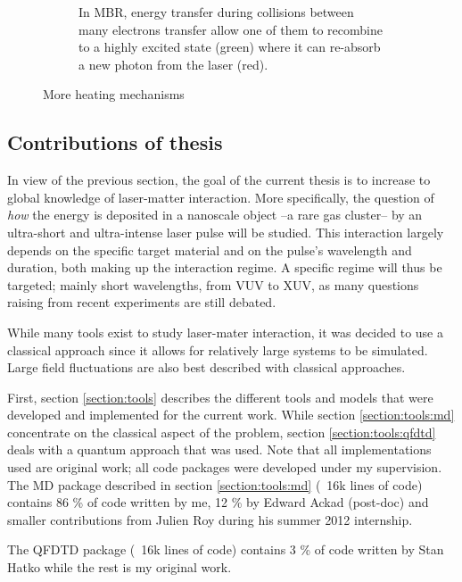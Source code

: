 \begin{figure}
\begin{subfigure}{0.48\columnwidth}
        \caption{In MBR, energy transfer during collisions between many
                 electrons transfer allow one of them to recombine to a highly
                 excited state (green) where it can re-absorb a new photon from
                 the laser (red).}
        \label{fig:heating:mbr}
    \end{subfigure}
 \caption{More heating mechanisms}
 \label{fig:heating}
\end{figure}






\subsection{Contributions of thesis}

In view of the previous section, the goal of the current thesis is to increase
to global knowledge of laser-matter interaction. More specifically, the
question of \textit{how} the energy is deposited in a nanoscale object
--a rare gas cluster-- by an
ultra-short and ultra-intense laser pulse will be studied. This interaction
largely depends on the specific target material and on the pulse's wavelength
and duration, both making up the interaction regime. A specific regime will
thus be targeted; mainly short wavelengths, from VUV to XUV, as many questions
raising from recent experiments are still debated.

While many tools exist to study laser-mater interaction, it was decided to use
a classical approach since it allows for relatively large systems to be
simulated. Large field fluctuations are also best described with
classical approaches\cite{Fennel2010}.


First, section \ref{section:tools} describes the different tools and models
that were developed and implemented for the current work. While section
\ref{section:tools:md} concentrate on the classical aspect of the problem,
section \ref{section:tools:qfdtd} deals with a quantum approach that was
used. Note that all implementations used are original work; all code packages
were developed under my supervision. The MD package described in section
\ref{section:tools:md} (~16k lines of code) contains 86 \% of code written by
me, 12 \% by Edward Ackad (post-doc) and smaller contributions from Julien Roy
during his summer 2012 internship.

The QFDTD package (~16k lines of code) contains 3 \% of code written by Stan
Hatko while the rest is my original work.

